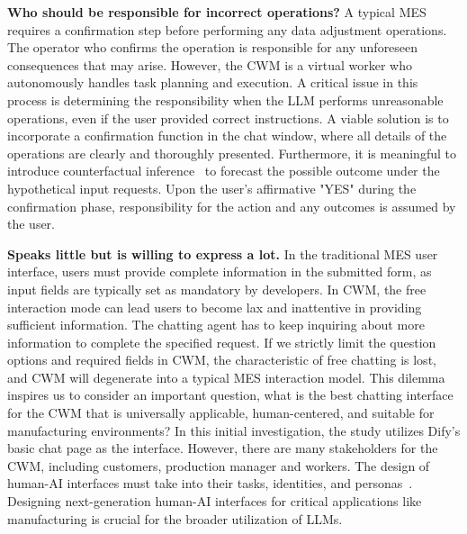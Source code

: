\documentclass[preprint,12pt]{elsarticle}
\begin{document}
\textbf{Who should be responsible for incorrect operations?}
A typical MES requires a confirmation step before performing any data adjustment operations.
The operator who confirms the operation is responsible for any unforeseen consequences that may arise.
However, the CWM is a virtual worker who autonomously handles task planning and execution.
A critical issue in this process is determining the responsibility when the LLM performs unreasonable operations, even if the user provided correct instructions.
A viable solution is to incorporate a confirmation function in the chat window, where all details of the operations are clearly and thoroughly presented. 
Furthermore, it is meaningful to introduce counterfactual inference~\cite{del2024generating} to forecast the possible outcome under the hypothetical input requests.
Upon the user's affirmative "YES" during the confirmation phase, responsibility for the action and any outcomes is assumed by the user.

\textbf{Speaks little but is willing to express a lot.}
In the traditional MES user interface, users must provide complete information in the submitted form, as input fields are typically set as mandatory by developers.
In CWM, the free interaction mode can lead users to become lax and inattentive in providing sufficient information.
The chatting agent has to keep inquiring about more information to complete the specified request.
If we strictly limit the question options and required fields in CWM, the characteristic of free chatting is lost, and CWM will degenerate into a typical MES interaction model.
This dilemma inspires us to consider an important question, what is the best chatting interface for the CWM that is universally applicable, human-centered, and suitable for manufacturing environments?
In this initial investigation, the study utilizes Dify's basic chat page as the interface.
However, there are many stakeholders for the CWM, including customers, production manager and workers.
The design of human-AI interfaces must take into their tasks, identities, and personas~\cite{holzinger2022personas}.
Designing next-generation human-AI interfaces for critical applications like manufacturing is crucial for the broader utilization of LLMs.
\end{document}
